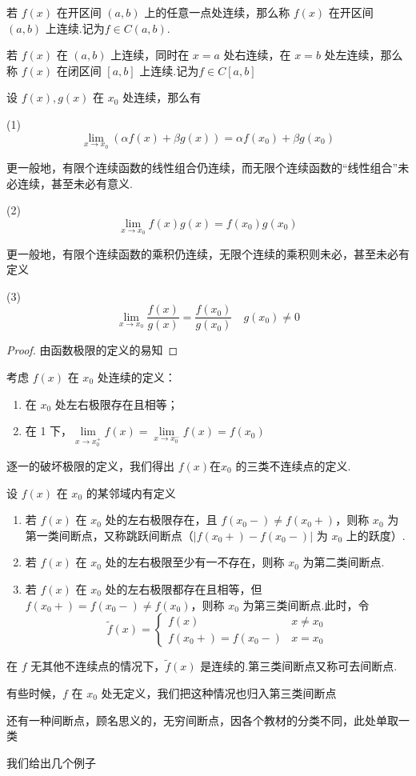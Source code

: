 \begin{definition}
	若 $f(x)$ 在开区间 $(a, b)$ 上的任意一点处连续，那么称 $f(x)$ 在开区间 $(a, b)$ 上连续.记为$f\in C(a,b)$.
	
	若 $f(x)$ 在 $(a, b)$ 上连续，同时在 $x = a$ 处右连续，在 $x = b$ 处左连续，那么称 $f(x)$ 在闭区间 $[a, b]$ 上连续.记为$f\in C[a,b]$
	
	
\end{definition}
\begin{proposition}
	
	设 $f(x), g(x)$ 在 $x_0$ 处连续，那么有
	
	(1) $$\lim_{x \to x_0} (\alpha f(x) + \beta g(x)) = \alpha f(x_0) + \beta g(x_0)$$
	
	更一般地，有限个连续函数的线性组合仍连续，而无限个连续函数的“线性组合”未必连续，甚至未必有意义.
	
	(2) $$\lim_{x \to x_0} f(x)g(x) = f(x_0)g(x_0)$$
	
	更一般地，有限个连续函数的乘积仍连续，无限个连续的乘积则未必，甚至未必有定义
	
	(3) $$\lim_{x \to x_0} \frac{f(x)}{g(x)} = \frac{f(x_0)}{g(x_0)}\quad g(x_0) \neq 0$$ 
\end{proposition}
\begin{proof}
	由函数极限的定义的易知
\end{proof}

考虑 $f(x)$ 在 $x_0$ 处连续的定义：
\begin{enumerate}
	\item 在 $x_0$ 处左右极限存在且相等；
	\item 在 1 下，$\lim\limits_{x \to x_0^+} f(x) =\lim\limits_{x \to x_0^-} f(x)= f(x_0)$
\end{enumerate}

逐一的破坏极限的定义，我们得出 $f(x)$在$x_0$ 的三类不连续点的定义.
\begin{definition}
	设 $f(x)$ 在 $x_0$ 的某邻域内有定义
	\begin{enumerate}
		\item  若 $f(x)$ 在 $x_0$ 处的左右极限存在，且 $f(x_0-) \neq f(x_0+)$，则称 $x_0$ 为第一类间断点，又称跳跃间断点（$|f(x_0+) - f(x_0-)|$ 为 $x_0$ 上的跃度）.
		\item 若 $f(x)$ 在 $x_0$ 处的左右极限至少有一不存在，则称 $x_0$ 为第二类间断点.
		\item 若 $f(x)$ 在 $x_0$ 处的左右极限都存在且相等，但 $f(x_0+) = f(x_0-) \neq f(x_0)$，则称 $x_0$ 为第三类间断点.此时，令	
		\[
		\widetilde{f}(x) = \begin{cases}
			f(x) & x \neq x_0 \\
			f(x_0+) = f(x_0-) & x = x_0
		\end{cases}
		\]
	\end{enumerate}
	在 $f$ 无其他不连续点的情况下，$\widetilde{f}(x)$ 是连续的.第三类间断点又称可去间断点.
	
	有些时候，$f$ 在 $x_0$ 处无定义，我们把这种情况也归入第三类间断点
	
	还有一种间断点，顾名思义的，无穷间断点，因各个教材的分类不同，此处单取一类
\end{definition}
我们给出几个例子


